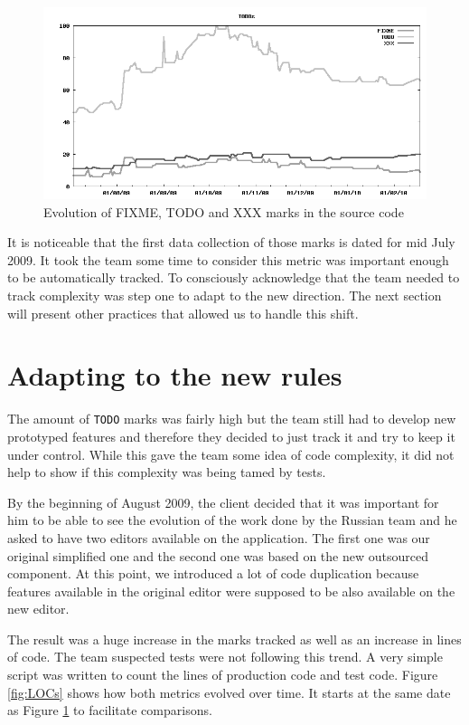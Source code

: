\documentclass[lnbip]{svmultln}
\begin{document}
\begin{figure}[hbt]
  \centerline{
    \includegraphics[width=120mm]{TODOs}
  }
  \caption{Evolution of FIXME, TODO and XXX marks in the source code}
  \label{fig:TODOs}
\end{figure}

It is noticeable that the first data collection of those marks is
dated for mid July 2009. It took the team some time to consider this
metric was important enough to be automatically tracked. To
consciously acknowledge that the team needed to track complexity was
step one to adapt to the new direction. The next section will present
other practices that allowed us to handle this shift.

\section{Adapting to the new rules}
\label{sec:adapting}

The amount of \texttt{TODO} marks was fairly high but the team still
had to develop new prototyped features and therefore they decided to
just track it and try to keep it under control. While this gave the
team some idea of code complexity, it did not help to show if this
complexity was being tamed by tests.

By the beginning of August 2009, the client decided that it was
important for him to be able to see the evolution of the work done by
the Russian team and he asked to have two editors available on the
application. The first one was our original simplified one and the
second one was based on the new outsourced component. At this point,
we introduced a lot of code duplication because features available in
the original editor were supposed to be also available on the new
editor.

The result was a huge increase in the marks tracked as well as an
increase in lines of code. The team suspected tests were not following
this trend. A very simple script was written to count the lines of
production code and test code. Figure \ref{fig:LOCs} shows how both
metrics evolved over time. It starts at the same date as Figure
\ref{fig:TODOs} to facilitate comparisons.
\end{document}

